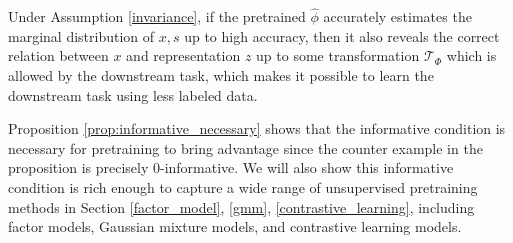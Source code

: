Under Assumption \ref{invariance}, if the pretrained $\hat{\phi}$ accurately estimates the marginal distribution of $x,s$ up to high accuracy, then it also reveals the correct relation between $x$ and representation $z$ up to some transformation $\mathcal{T}_{\Phi}$ which is allowed by the downstream task, which makes it possible to learn the downstream task using less labeled data. 

Proposition \ref{prop:informative_necessary} shows that the informative condition is necessary for pretraining to bring advantage since the counter example in the proposition is precisely $0$-informative. We will also show this informative condition is rich enough to capture a wide range of unsupervised pretraining methods in Section \ref{factor_model}, \ref{gmm}, \ref{contrastive_learning}, including factor models, Gaussian mixture models, and contrastive learning models.




